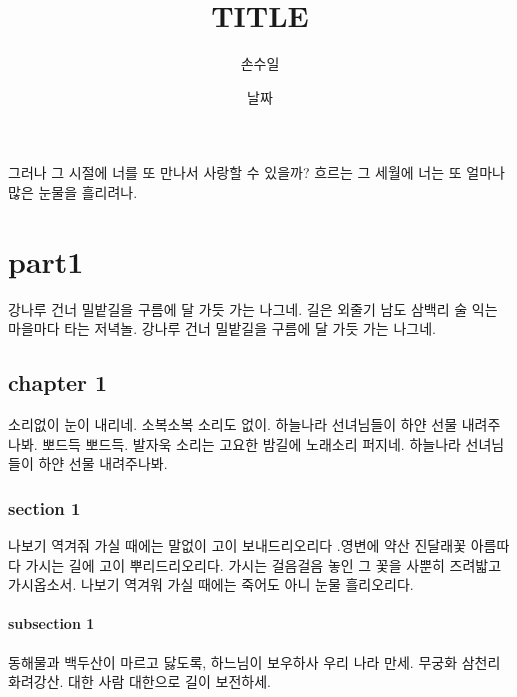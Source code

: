 \documentclass[a4paper, 11pt]{book}
\begin{document}
\frontmatter



\title{TITLE}
\author{손수일}
\date{날짜}
\maketitle


그러나 그 시절에 너를 또 만나서 사랑할 수 있을까? 흐르는 그 세월에 너는 또 얼마나 많은 눈물을 흘리려나.

\mainmatter

\tableofcontents



\part{part1}
강나루 건너 밀밭길을 구름에 달 가듯 가는 나그네. 길은 외줄기 남도 삼백리 술 익는 마을마다 타는 저녁놀. 강나루 건너 밀밭길을 구름에 달 가듯 가는 나그네.


\chapter{chapter 1}
소리없이 눈이 내리네. 소복소복 소리도 없이. 하늘나라 선녀님들이 하얀 선물 내려주나봐. 뽀드득 뽀드득. 발자욱 소리는 고요한 밤길에 노래소리 퍼지네. 하늘나라 선녀님들이 하얀 선물 내려주나봐.


\section{section 1}
나보기 역겨줘 가실 때에는 말없이 고이 보내드리오리다 .영변에 약산 진달래꽃 아름따다 가시는 길에 고이 뿌리드리오리다. 가시는 걸음걸음 놓인 그 꽃을 사뿐히 즈려밟고 가시옵소서. 나보기 역겨워 가실 때에는 죽어도 아니 눈물 흘리오리다.
\subsection{subsection 1}
동해물과 백두산이 마르고 닳도록, 하느님이 보우하사 우리 나라 만세. 무궁화 삼천리 화려강산. 대한 사람 대한으로 길이 보전하세.
\end{document}
